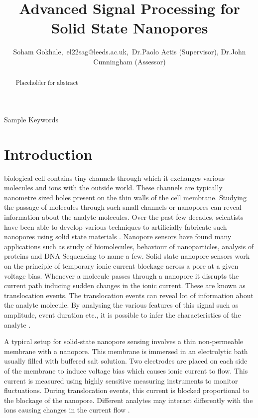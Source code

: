\documentclass[journal]{IEEEtran}
\begin{document}
\title{Advanced Signal Processing for Solid State Nanopores}
\author{Soham Gokhale,\ el22sag@leeds.ac.uk,\ Dr.Paolo Actis (Supervisor), Dr.John Cunningham (Assessor)}

\maketitle

\begin{abstract}
Placeholder for abstract
\end{abstract}

\begin{IEEEkeywords}
Sample Keywords
\end{IEEEkeywords}

\section{Introduction}
 biological cell contains tiny channels through which it exchanges various molecules and ions with the outside world. These channels are typically nanometre sized holes present on the thin walls of the cell membrane. Studying the passage of molecules through such small channels or nanopores can reveal information about the analyte molecules. Over the past few decades, scientists have been able to develop various techniques to artificially fabricate such nanopores using solid state materials \cite{dekkerSolidstateNanopores2007,xueSolidstateNanoporeSensors2020}. Nanopore sensors have found many applications such as study of biomolecules, behaviour of nanoparticles, analysis of proteins \cite{luoApplicationSolidStateNanopore2020} and DNA Sequencing \cite{deamerThreeDecadesNanopore2016} to name a few. Solid state nanopore sensors work on the principle of temporary ionic current blockage across a pore at a given voltage bias. Whenever a molecule passes through a nanopore it disrupts the current path inducing sudden changes in the ionic current. These are known as translocation events. The translocation events can reveal lot of information about the analyte molecule. By analysing the various features of this signal such as amplitude, event duration etc., it is possible to infer the characteristics of the analyte \cite{wenGuideSignalProcessing2021}.

A typical setup for solid-state nanopore sensing involves a thin non-permeable membrane with a nanopore. This membrane is immersed in an electrolytic bath usually filled with buffered salt solution. Two electrodes are placed on each side of the membrane to induce voltage bias which causes ionic current to flow. This current is measured using highly sensitive measuring instruments to monitor fluctuations. During translocation events, this current is blocked proportional to the blockage of the nanopore. Different analytes may interact differently with the ions causing changes in the current flow \cite{xueSolidstateNanoporeSensors2020}.
\end{document}
